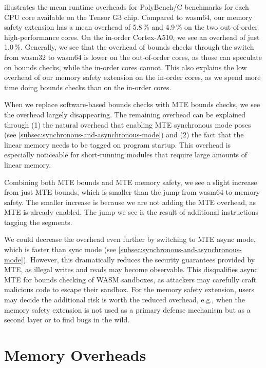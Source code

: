  illustrates the mean runtime overheads for PolyBench/C benchmarks for each CPU core available on the Tensor G3 chip.
Compared to wasm64, our memory safety extension has a mean overhead of 5.8\,\% and 4.9\,\% on the two out-of-order high-performance cores.
On the in-order Cortex-A510, we see an overhead of just 1.0\,\%.
Generally, we see that the overhead of bounds checks through the switch from wasm32 to wasm64 is lower on the out-of-order cores, as those can speculate on bounds checks, while the in-order cores cannot.
This also explains the low overhead of our memory safety extension on the in-order cores, as we spend more time doing bounds checks than on the in-order cores.

When we replace software-based bounds checks with \ac{MTE} bounds checks, we see the overhead largely disappearing.
The remaining overhead can be explained through (1) the natural overhead that enabling \ac{MTE} synchronous mode poses (see \cref{subsec:synchronous-and-asynchronous-mode}) and (2) the fact that the linear memory needs to be tagged on program startup.
This overhead is especially noticeable for short-running modules that require large amounts of linear memory.

Combining both \ac{MTE} bounds and \ac{MTE} memory safety, we see a slight increase from just \ac{MTE} bounds, which is smaller than the jump from wasm64 to memory safety.
The smaller increase is because we are not adding the \ac{MTE} overhead, as \ac{MTE} is already enabled.
The jump we see is the result of additional instructions tagging the segments.

We could decrease the overhead even further by switching to \ac{MTE} async mode, which is faster than sync mode (see \cref{subsec:synchronous-and-asynchronous-mode}).
However, this dramatically reduces the security guarantees provided by \ac{MTE}, as illegal writes and reads may become observable.
This disqualifies async \ac{MTE} for bounds checking of \ac{WASM} sandboxes, as attackers may carefully craft malicious code to escape their sandbox.
For the memory safety extension, users may decide the additional risk is worth the reduced overhead, e.g., when the memory safety extension is not used as a primary defense mechanism but as a second layer or to find bugs in the wild.


\section{Memory Overheads}\label{sec:memory-overheads}

